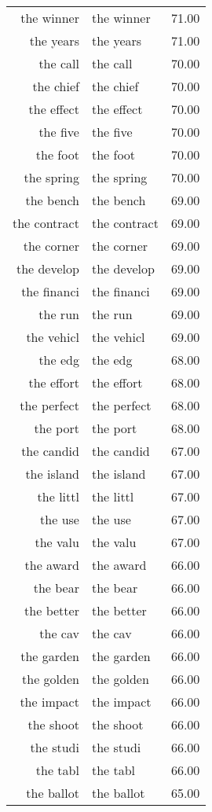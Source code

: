 \begin{table}[ht]
\begin{tabular}{rlr}
  the winner & the winner & 71.00 \\ 
  the years & the years & 71.00 \\ 
  the call & the call & 70.00 \\ 
  the chief & the chief & 70.00 \\ 
  the effect & the effect & 70.00 \\ 
  the five & the five & 70.00 \\ 
  the foot & the foot & 70.00 \\ 
  the spring & the spring & 70.00 \\ 
  the bench & the bench & 69.00 \\ 
  the contract & the contract & 69.00 \\ 
  the corner & the corner & 69.00 \\ 
  the develop & the develop & 69.00 \\ 
  the financi & the financi & 69.00 \\ 
  the run & the run & 69.00 \\ 
  the vehicl & the vehicl & 69.00 \\ 
  the edg & the edg & 68.00 \\ 
  the effort & the effort & 68.00 \\ 
  the perfect & the perfect & 68.00 \\ 
  the port & the port & 68.00 \\ 
  the candid & the candid & 67.00 \\ 
  the island & the island & 67.00 \\ 
  the littl & the littl & 67.00 \\ 
  the use & the use & 67.00 \\ 
  the valu & the valu & 67.00 \\ 
  the award & the award & 66.00 \\ 
  the bear & the bear & 66.00 \\ 
  the better & the better & 66.00 \\ 
  the cav & the cav & 66.00 \\ 
  the garden & the garden & 66.00 \\ 
  the golden & the golden & 66.00 \\ 
  the impact & the impact & 66.00 \\ 
  the shoot & the shoot & 66.00 \\ 
  the studi & the studi & 66.00 \\ 
  the tabl & the tabl & 66.00 \\ 
  the ballot & the ballot & 65.00 \\ 

\end{tabular}
\end{table}
